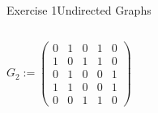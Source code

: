 \begin{frame}[allowframebreaks]{Exercise 1}{Undirected Graphs}
\begin{solutionnoinc}
\begin{columns}
      \begin{column}{0.5\textwidth}
      \end{column}
    \end{columns}
  \end{solutionnoinc}
  \begin{solution}
    \begin{columns}
      \begin{column}{0.5\textwidth}
        \centering
        $G_2 :=
        \begin{pmatrix}
        0 & 1 & 0 & 1 & 0 \\
        1 & 0 & 1 & 1 & 0 \\
        0 & 1 & 0 & 0 & 1 \\
        1 & 1 & 0 & 0 & 1 \\
        0 & 0 & 1 & 1 & 0
        \end{pmatrix}$
      \end{column}
      \begin{column}{0.5\textwidth}
      \end{column}
    \end{columns}
  \end{solution}
\end{frame}
